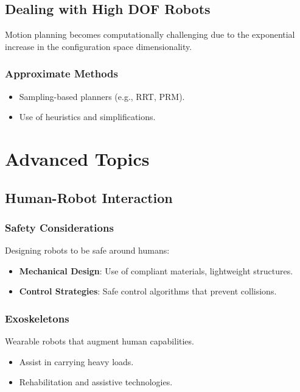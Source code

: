 \documentclass{article}
\begin{document}
\subsection{Dealing with High DOF Robots}

Motion planning becomes computationally challenging due to the exponential increase in the configuration space dimensionality.

\subsubsection{Approximate Methods}

\begin{itemize}
    \item Sampling-based planners (e.g., RRT, PRM).
    \item Use of heuristics and simplifications.
\end{itemize}

\section{Advanced Topics}

\subsection{Human-Robot Interaction}

\subsubsection{Safety Considerations}

Designing robots to be safe around humans:

\begin{itemize}
    \item \textbf{Mechanical Design}: Use of compliant materials, lightweight structures.
    \item \textbf{Control Strategies}: Safe control algorithms that prevent collisions.
\end{itemize}

\subsubsection{Exoskeletons}

Wearable robots that augment human capabilities.

\begin{itemize}
    \item Assist in carrying heavy loads.
    \item Rehabilitation and assistive technologies.
\end{itemize}
\end{document}
